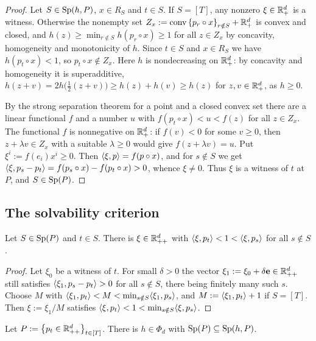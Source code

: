 \begin{proof}
Let $S\in\Sp(h,P)$, $x\in R_S$ and $t\in S$. If $S=[T]$, any nonzero $\xi\in\Rp[d]$ is a witness. Otherwise the nonempty set $Z_x:=\conv\set{p_r\circ x}_{r\notin S}+\Rp[d]$ is convex and closed, and $h(z)\ge\min_{r\notin S}h(p_r\circ x)\ge1$ for all $z\in Z_x$ by concavity, homogeneity and monotonicity of $h$. Since $t\in S$ and $x\in R_S$ we have $h(p_t\circ x)<1$, so $p_t\circ x\notin Z_x$. Here $h$ is nondecreasing on $\Rp[d]$: by concavity and homogeneity it is superadditive, $h(z+v)=2h\bigl(\tfrac12(z+v)\bigr)\ge h(z)+h(v)\ge h(z)$ for $z,v\in\Rp[d]$, as $h\ge0$.

By the strong separation theorem for a point and a closed convex set \citep[Thm.~11.4]{Rockafellar1970} there are a linear functional $f$ and a number $u$ with $f(p_t\circ x)<u<f(z)$ for all $z\in Z_x$. The functional $f$ is nonnegative on $\Rp[d]$: if $f(v)<0$ for some $v\ge0$, then $z+\lambda v\in Z_x$ with a suitable $\lambda\ge0$ would give $f(z+\lambda v)=u$. Put $\xi^i:=f(e_i)x^i\ge0$. Then $\ip{\xi}{p}=f(p\circ x)$, and for $s\notin S$ we get $\ip{\xi}{p_s-p_t}=f(p_s\circ x)-f(p_t\circ x)>0$, whence $\xi\ne0$. Thus $\xi$ is a witness of $t$ at $P$, and $S\in\Sp(P)$.
\end{proof}

\subsection{The solvability criterion}

\begin{lemma}[separation]\label{lem:separation}
Let $S\in\Sp(P)$ and $t\in S$. There is $\xi\in\Rpp[d]$ with $\ip{\xi}{p_t}<1<\ip{\xi}{p_s}$ for all $s\notin S$.
\end{lemma}

\begin{proof}
Let $\xi_0$ be a witness of $t$. For small $\delta>0$ the vector $\xi_1:=\xi_0+\delta\e\in\Rpp[d]$ still satisfies $\ip{\xi_1}{p_s-p_t}>0$ for all $s\notin S$, there being finitely many such $s$. Choose $M$ with $\ip{\xi_1}{p_t}<M<\min_{s\notin S}\ip{\xi_1}{p_s}$, and $M:=\ip{\xi_1}{p_t}+1$ if $S=[T]$. Then $\xi:=\xi_1/M$ satisfies $\ip{\xi}{p_t}<1<\min_{s\notin S}\ip{\xi}{p_s}$.
\end{proof}

\begin{lemma}[patching]\label{lem:patch}
Let $P:=\set{p_t\in\Rpp[d]}_{t\in[T]}$. There is $h\in\Phi_d$ with $\Sp(P)\subseteq\Sp(h,P)$.
\end{lemma}


